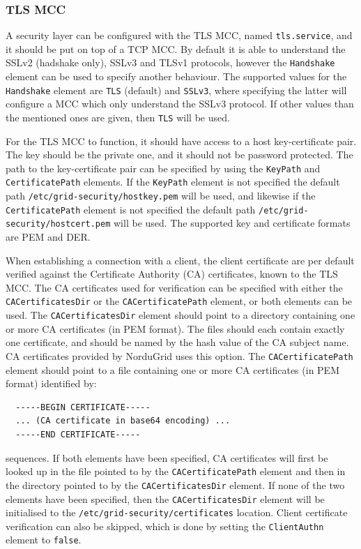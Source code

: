 \documentclass{article}
\begin{document}
\subsubsection{TLS MCC}\label{sec:tls-mcc}
A security layer can be configured with the TLS MCC, named \texttt{tls.service},
and it should be put on top of a TCP MCC. By default it is able to understand
the SSLv2 (hadshake only), SSLv3 and TLSv1 protocols, however the \texttt{Handshake} 
element can be used to specify another behaviour. The supported values for the
\texttt{Handshake} element are \texttt{TLS} (default) and \texttt{SSLv3}, where
specifying the latter will configure a MCC which only understand the SSLv3
protocol. If other values than the mentioned ones are given, then \texttt{TLS}
will be used.

For the TLS MCC to function, it should have access to a host key-certificate
pair. The key should be the private one, and it should not be password
protected. The path to the key-certificate pair can be specified by using the
\texttt{KeyPath} and \texttt{CertificatePath} elements. If the \texttt{KeyPath}
element is not specified the default path
\texttt{/etc/grid-security/hostkey.pem} will be used, and likewise if the
\texttt{CertificatePath} element is not specified the default path
\texttt{/etc/grid-security/hostcert.pem} will be used. The supported key and
certificate formats are PEM and DER.

When establishing a connection with a client, the client certificate are per
default verified against the Certificate Authority (CA) certificates, known to
the TLS MCC. The CA certificates used for verification can be specified with
either the \texttt{CACertificatesDir} or the \texttt{CACertificatePath} element,
or both elements can be used. The \texttt{CACertificatesDir} element should
point to a directory containing one or more CA certificates (in PEM format). The
files should each contain exactly one certificate, and should be named by the
hash value of the CA subject name. CA certificates provided by NorduGrid uses
this option. The \texttt{CACertificatePath} element should point to a file
containing one or more CA certificates (in PEM format) identified by:
\begin{lstlisting}
  -----BEGIN CERTIFICATE-----
  ... (CA certificate in base64 encoding) ...
  -----END CERTIFICATE-----
\end{lstlisting}
sequences. If both elements have been specified, CA certificates will first be
looked up in the file pointed to by the \texttt{CACertificatePath} element and
then in the directory pointed to by the \texttt{CACertificatesDir} element. If
none of the two elements have been specified, then the
\texttt{CACertificatesDir} element will be initialised to the
\texttt{/etc/grid-security/certificates} location. Client certificate
verification can also be skipped, which is done by setting the
\texttt{ClientAuthn} element to \texttt{false}.
\end{document}
